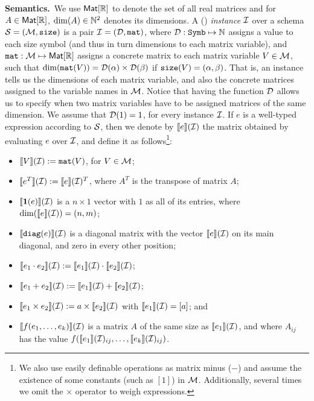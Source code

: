 \smallskip
\noindent
\textbf{Semantics.}\, We use $\textsf{Mat}[\mathbb{R}]$ to denote the set of all real matrices and for 
$A\in\textsf{Mat}[\mathbb{R}]$, $\dim(A)\in\mathbb{N}^2$ denotes its dimensions.
A (\lang) \textit{instance} $\mathcal{I}$ over a schema$\mathcal{S}=(\mathcal{M},\texttt{size})$ is a pair $\mathcal{I} = (\mathcal{D},\texttt{mat})$, where $\mathcal{D} : \texttt{Symb} \mapsto \mathbb{N}$ assigns a value to each size symbol (and thus in turn  dimensions to each matrix variable), and $\texttt{mat} : \mathcal{M} \mapsto \textsf{Mat}[\mathbb{R}]$ assigns a concrete matrix to each matrix variable $V\in \mathcal{M}$, such that $\dim(\texttt{mat}(V)) = \mathcal{D}(\alpha)\times \mathcal{D}(\beta)$ if $\texttt{size}(V) = (\alpha,\beta)$. That is, an instance tells us the dimensions of each matrix variable, and also the concrete matrices assigned to the variable names in $\mathcal{M}$. Notice that having the function $\mathcal{D}$ allows us to specify when two matrix variables have to be assigned matrices of the same dimension. We assume that $\mathcal{D}(1) = 1$, for every instance $\mathcal{I}$. If $e$ is a well-typed expression according to $\mathcal{S}$, then we denote by $\llbracket e \rrbracket(\mathcal{I})$ the matrix obtained by evaluating $e$ over $\mathcal{I}$, and define it as follows\footnote{We also use easily definable operations as matrix minus ($-$) and assume the existence of some constants (such as $[1]$) in $\mathcal{M}$. Additionally, several times we omit the $\times$ operator to weigh expressions.}:
\begin{itemize}
\item $\llbracket V \rrbracket(\mathcal{I}) := \texttt{mat}(V)$, for $V\in \mathcal{M}$;
\item $\llbracket e^T \rrbracket(\mathcal{I}) := \llbracket e \rrbracket(\mathcal{I})^T$, where $A^T$ is the transpose of matrix $A$;
\item $\llbracket \mathbf{1}(e) \rrbracket(\mathcal{I})$ is a $n\times 1$ vector with $1$ as all of its entries, where $\dim(\llbracket e \rrbracket(\mathcal{I}))=(n,m)$;
\item $\llbracket \texttt{diag}(e) \rrbracket(\mathcal{I})$ is a diagonal matrix with the vector $\llbracket e \rrbracket(\mathcal{I})$ on its main diagonal, and zero in every other position;
\item $\llbracket e_1\cdot e_2 \rrbracket(\mathcal{I}) := \llbracket e_1 \rrbracket(\mathcal{I}) \cdot \llbracket e_2 \rrbracket(\mathcal{I})$;
\item $\llbracket e_1+ e_2 \rrbracket(\mathcal{I}) := \llbracket e_1 \rrbracket(\mathcal{I}) + \llbracket e_2 \rrbracket(\mathcal{I})$;
\item $\llbracket e_1\times e_2 \rrbracket(\mathcal{I}) := a\times \llbracket e_2 \rrbracket(\mathcal{I})$ with $\llbracket e_1 \rrbracket(\mathcal{I})=[a]$; and
\item $\llbracket f(e_1,\ldots ,e_k) \rrbracket(\mathcal{I})$ is a matrix $A$ of the same size as $\llbracket e_1 \rrbracket(\mathcal{I})$, and where $A_{ij}$ has the value $f(\llbracket e_1 \rrbracket(\mathcal{I})_{ij},\ldots ,\llbracket e_k \rrbracket(\mathcal{I})_{ij})$.
\end{itemize}

